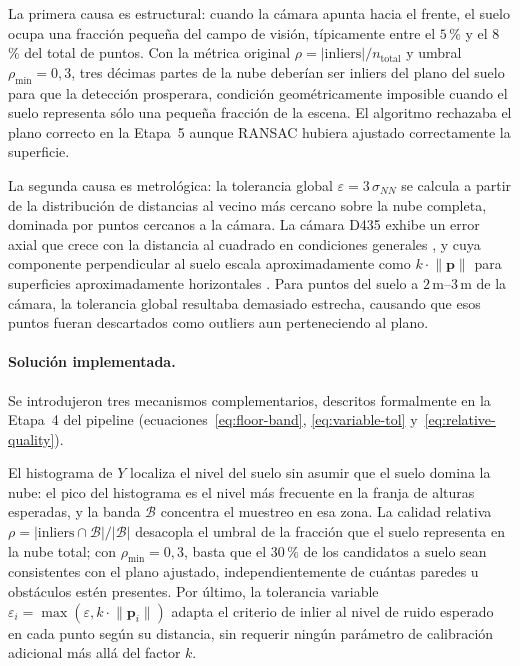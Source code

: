 La primera causa es estructural: cuando la cámara apunta hacia el frente,
el suelo ocupa una fracción pequeña del campo de visión, típicamente entre
el $5\,$\% y el $8\,$\% del total de puntos. Con la métrica original
$\rho = |\text{inliers}| / n_{\text{total}}$ y umbral $\rho_{\min} = 0{,}3$,
tres décimas partes de la nube deberían ser inliers del plano del suelo para
que la detección prosperara, condición geométricamente imposible cuando el
suelo representa sólo una pequeña fracción de la escena. El algoritmo
rechazaba el plano correcto en la Etapa~5 aunque RANSAC hubiera ajustado
correctamente la superficie.

La segunda causa es metrológica: la tolerancia global $\varepsilon = 3\,\sigma_{NN}$
se calcula a partir de la distribución de distancias al vecino más cercano
sobre la nube completa, dominada por puntos cercanos a la cámara. La
cámara D435 exhibe un error axial que crece con la distancia al cuadrado en
condiciones generales \cite{RS-D400}, y cuya componente perpendicular al
suelo escala aproximadamente como $k \cdot \lVert\mathbf{p}\rVert$ para
superficies aproximadamente horizontales \cite{IntelRealSenseDepthTuning}.
Para puntos del suelo a $2\, \text{m}$--$3\,\text{m}$ de la cámara, la
tolerancia global resultaba demasiado estrecha, causando que esos puntos
fueran descartados como outliers aun perteneciendo al plano.

\paragraph{Solución implementada.}
Se introdujeron tres mecanismos complementarios, descritos formalmente en
la Etapa~4 del pipeline (ecuaciones~\ref{eq:floor-band},
\ref{eq:variable-tol} y~\ref{eq:relative-quality}).

El histograma de $Y$ localiza el nivel del suelo sin asumir que el suelo
domina la nube: el pico del histograma es el nivel más frecuente en la
franja de alturas esperadas, y la banda $\mathcal{B}$ concentra el muestreo
en esa zona. La calidad relativa $\rho = |\text{inliers} \cap \mathcal{B}| / |\mathcal{B}|$
desacopla el umbral de la fracción que el suelo representa en la nube total;
con $\rho_{\min} = 0{,}3$, basta que el $30\,$\% de los candidatos a suelo
sean consistentes con el plano ajustado, independientemente de cuántas
paredes u obstáculos estén presentes. Por último, la tolerancia variable
$\varepsilon_i = \max(\varepsilon, k\cdot\lVert\mathbf{p}_i\rVert)$ adapta
el criterio de inlier al nivel de ruido esperado en cada punto según su
distancia, sin requerir ningún parámetro de calibración adicional más allá
del factor $k$.

